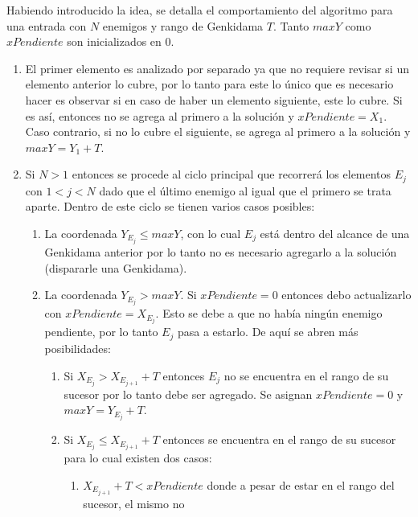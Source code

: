 	Habiendo introducido la idea, se detalla el comportamiento del algoritmo para
	una entrada con $N$ enemigos y rango de Genkidama $T$. Tanto $maxY$ como
	$xPendiente$ son inicializados en 0.

	\begin{enumerate}
		\item{
			El primer elemento es analizado por separado ya que no requiere
			revisar si un elemento anterior lo cubre, por lo tanto para este lo
			único que es necesario hacer es observar si en caso de haber un elemento
			siguiente, este lo cubre. Si es así, entonces no se agrega al primero a
			la solución y $xPendiente = X_1$. Caso contrario, si no lo cubre el
			siguiente, se agrega al primero a la solución y $maxY = Y_1 +
			T$.\label{ej2_imp:caso_base}
		}

		\item{
			Si $N > 1$ entonces se procede al ciclo principal que recorrerá los
			elementos $E_j$ con $1 < j < N$ dado que el último enemigo al igual
			que el primero se trata aparte. Dentro de este ciclo se tienen
			varios casos posibles:
			\begin{enumerate}
				\item{
					\label{ej2_imp:caso_y_max}
					La coordenada $Y_{E_j} \leq maxY$, con lo cual $E_j$ está
					dentro del alcance de una Genkidama anterior por lo tanto no
					es necesario agregarlo a la solución (dispararle una
					Genkidama).
				}
				\item{
					La coordenada $Y_{E_j} > maxY$. Si $xPendiente = 0$ entonces
					debo actualizarlo con $xPendiente = X_{E_j}$. Esto se debe a
					que no había ningún enemigo pendiente, por lo tanto $E_j$
					pasa a estarlo. De aquí se abren más posibilidades:
					\begin{enumerate}
						\item{
							\label{ej2_imp:caso_no_cubierto}
							Si $X_{E_j} > X_{E_{j+1}} + T$ entonces $E_j$ no
							se encuentra en el rango de su sucesor por lo tanto
							debe ser agregado. Se asignan $xPendiente = 0$ y
							$maxY = Y_{E_j} + T$.
						}
						\item{
							Si $X_{E_j} \leq X_{E_{j+1}} + T$ entonces se
							encuentra en el rango de su sucesor para lo cual
							existen dos casos:
							\begin{enumerate}
								\item{
									\label{ej2_imp:caso_no_cubierto_pendiente}
									$X_{E_{j+1}} + T < xPendiente$ donde a pesar
									de estar en el rango del sucesor, el mismo no
}
\end{enumerate}}
\end{enumerate}}
\end{enumerate}}
\end{enumerate}
